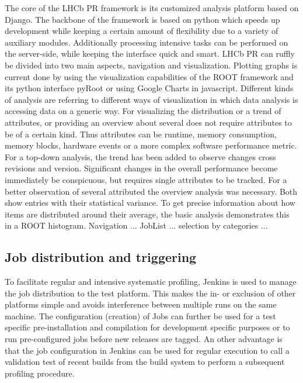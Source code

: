 \documentclass[a4paper]{jpconf}
\begin{document}
The core of the LHCb PR framework is its customized analysis platform based on Django. The backbone of the framework is based on python which speeds up development while keeping a certain amount of flexibility due to a variety of auxiliary modules. Additionally processing intensive tasks can be performed on the server-side, while keeping the interface quick and smart.
\newline
LHCb PR can ruffly be divided into two main aspects, navigation and visualization. Plotting graphs is current done by using the visualization capabilities of the ROOT framework and its python interface pyRoot or using Google Charts in javascript. Different kinds of analysis are referring to different ways of visualization in which data analysis is accessing data on a generic way. For visualizing the distribution or a trend of attributes, or providing an overview about several does not require attributes to be of a certain kind. Thus attributes can be runtime, memory consumption, memory blocks, hardware events or a more complex software performance metric.
\newline
For a top-down analysis, the trend has been added to observe changes cross revisions and version. Significant changes in the overall performance become immediately be conspicuous, but requires single attributes to be tracked. For a better observation of several attributed the overview analysis was necessary. Both show entries with their statistical variance. To get precise information about how items are distributed around their average, the basic analysis demonstrates this in a ROOT histogram.
\newline
Navigation ... JobList ... selection by categories ...


\subsection{Job distribution and triggering}
\label{sec:job_distribution}

To facilitate regular and intensive systematic profiling, Jenkins is used to manage the job distribution to the test platform. This makes the in- or exclusion of other platforms simple and avoids interference between multiple runs on the same machine. The configuration (creation) of Jobs can further be used for a test specific pre-installation and compilation for development specific purposes or to run pre-configured jobs before new releases are tagged.
\newline
An other advantage is that the job configuration in Jenkins can be used for regular execution to call a validation test of recent builds from the build system to perform a subsequent profiling procedure.  
\end{document}
